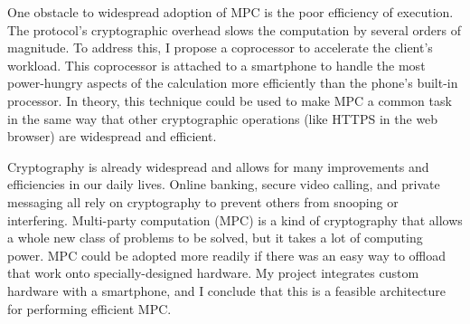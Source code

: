 \documentclass[12pt,letterpaper]{article}
\begin{document}
One obstacle to widespread adoption of MPC is the poor efficiency of execution. The protocol's cryptographic overhead slows the computation by several orders of magnitude. To address this, I propose a coprocessor to accelerate the client's workload. This coprocessor is attached to a smartphone to handle the most power-hungry aspects of the calculation more efficiently than the phone's built-in processor. In theory, this technique could be used to make MPC a common task in the same way that other cryptographic operations (like HTTPS in the web browser) are widespread and efficient.

Cryptography is already widespread and allows for many improvements and efficiencies in our daily lives. Online banking, secure video calling, and private messaging all rely on cryptography to prevent others from snooping or interfering. Multi-party computation (MPC) is a kind of cryptography that allows a whole new class of problems to be solved, but it takes a lot of computing power. MPC could be adopted more readily if there was an easy way to offload that work onto specially-designed hardware. My project integrates custom hardware with a smartphone, and I conclude that this is a feasible architecture for performing efficient MPC.
\end{document}
